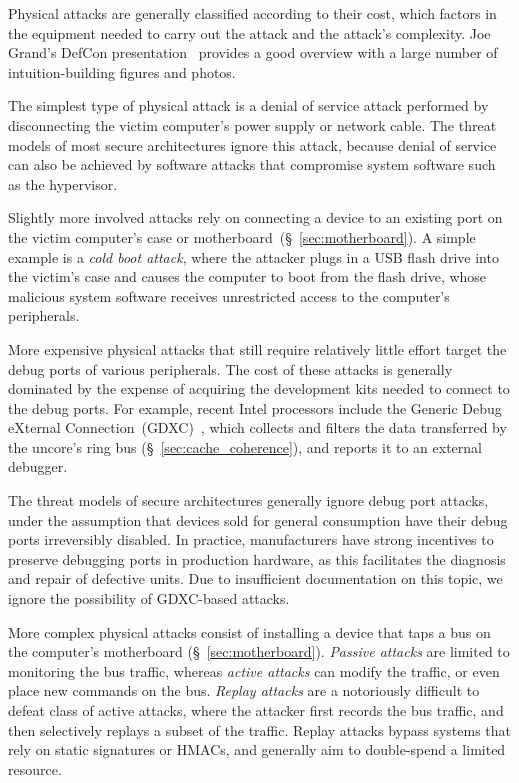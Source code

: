 \label{sec:physical_attacks}

Physical attacks are generally classified according to their cost, which
factors in the equipment needed to carry out the attack and the attack's
complexity. Joe Grand's DefCon presentation~\cite{grand2004physicalattacks}
provides a good overview with a large number of intuition-building figures and
photos.

The simplest type of physical attack is a denial of service attack performed by
disconnecting the victim computer's power supply or network cable. The threat
models of most secure architectures ignore this attack, because denial of
service can also be achieved by software attacks that compromise system
software such as the hypervisor.


\label{sec:physical_port_attacks}

Slightly more involved attacks rely on connecting a device to an existing port
on the victim computer's case or motherboard~(\S~\ref{sec:motherboard}). A
simple example is a \textit{cold boot attack}, where the attacker plugs in a
USB flash drive into the victim's case and causes the computer to boot from
the flash drive, whose malicious system software receives unrestricted access
to the computer's peripherals.

More expensive physical attacks that still require relatively little effort
target the debug ports of various peripherals. The cost of these attacks is
generally dominated by the expense of acquiring the development kits needed to
connect to the debug ports. For example, recent Intel processors include the
Generic Debug eXternal Connection~(GDXC)~\cite{yuffe2011sandybridge,
intel2011gdxc}, which collects and filters the data transferred by the uncore's
ring bus (\S~\ref{sec:cache_coherence}), and reports it to an external
debugger.

The threat models of secure architectures generally ignore debug port attacks,
under the assumption that devices sold for general consumption have their debug
ports irreversibly disabled. In practice, manufacturers have strong incentives
to preserve debugging ports in production hardware, as this facilitates the
diagnosis and repair of defective units. Due to insufficient documentation on
this topic, we ignore the possibility of GDXC-based attacks.


\label{sec:physical_bus_attacks}

More complex physical attacks consist of installing a device that taps a bus on
the computer's motherboard (\S~\ref{sec:motherboard}). \textit{Passive attacks}
are limited to monitoring the bus traffic, whereas \textit{active attacks} can
modify the traffic, or even place new commands on the bus. \textit{Replay
attacks} are a notoriously difficult to defeat class of active attacks, where
the attacker first records the bus traffic, and then selectively replays a
subset of the traffic. Replay attacks bypass systems that rely on static
signatures or HMACs, and generally aim to double-spend a limited resource.

